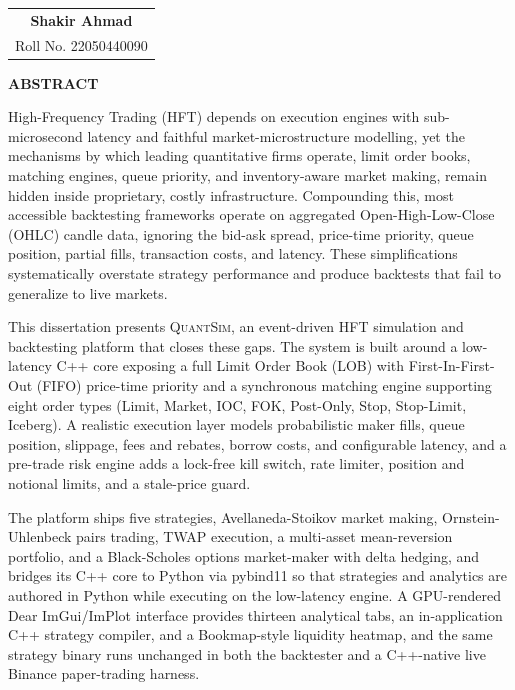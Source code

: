 \documentclass[12pt,oneside,a4paper]{report}
\newcommand{\quantsim}{\textsc{QuantSim}}
\begin{document}
\vspace{0.8in}

\begin{flushright}
\begin{tabular}{c}
\textbf{Shakir Ahmad} \\
Roll No. 22050440090
\end{tabular}
\end{flushright}

\clearpage
\begin{center}
{\Large\bfseries ABSTRACT}
\end{center}
\vspace{0.2in}

High-Frequency Trading (HFT) depends on execution engines with sub-microsecond latency and faithful market-microstructure modelling, yet the mechanisms by which leading quantitative firms operate, limit order books, matching engines, queue priority, and inventory-aware market making, remain hidden inside proprietary, costly infrastructure. Compounding this, most accessible backtesting frameworks operate on aggregated Open-High-Low-Close (OHLC) candle data, ignoring the bid-ask spread, price-time priority, queue position, partial fills, transaction costs, and latency. These simplifications systematically overstate strategy performance and produce backtests that fail to generalize to live markets.

This dissertation presents \quantsim{}, an event-driven HFT simulation and backtesting platform that closes these gaps. The system is built around a low-latency C++ core exposing a full Limit Order Book (LOB) with First-In-First-Out (FIFO) price-time priority and a synchronous matching engine supporting eight order types (Limit, Market, IOC, FOK, Post-Only, Stop, Stop-Limit, Iceberg). A realistic execution layer models probabilistic maker fills, queue position, slippage, fees and rebates, borrow costs, and configurable latency, and a pre-trade risk engine adds a lock-free kill switch, rate limiter, position and notional limits, and a stale-price guard.

The platform ships five strategies, Avellaneda-Stoikov market making, Ornstein-Uhlenbeck pairs trading, TWAP execution, a multi-asset mean-reversion portfolio, and a Black-Scholes options market-maker with delta hedging, and bridges its C++ core to Python via pybind11 so that strategies and analytics are authored in Python while executing on the low-latency engine. A GPU-rendered Dear ImGui/ImPlot interface provides thirteen analytical tabs, an in-application C++ strategy compiler, and a Bookmap-style liquidity heatmap, and the same strategy binary runs unchanged in both the backtester and a C++-native live Binance paper-trading harness.
\end{document}
